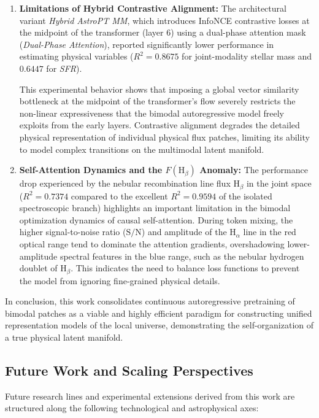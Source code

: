 \begin{enumerate}
	\item \textbf{Limitations of Hybrid Contrastive Alignment:} 
	The architectural variant \textit{Hybrid AstroPT MM}, which introduces InfoNCE contrastive losses at the midpoint of the transformer (layer 6) using a dual-phase attention mask (\textit{Dual-Phase Attention}), reported significantly lower performance in estimating physical variables ($R^2 = 0.8675$ for joint-modality stellar mass and $0.6447$ for \textit{\gls{SFR}}). 
	
	This experimental behavior shows that imposing a global vector similarity bottleneck at the midpoint of the transformer's flow severely restricts the non-linear expressiveness that the bimodal autoregressive model freely exploits from the early layers. Contrastive alignment degrades the detailed physical representation of individual physical flux patches, limiting its ability to model complex transitions on the multimodal latent manifold.
	
	\item \textbf{Self-Attention Dynamics and the $F(\text{H}_\beta)$ Anomaly:} 
	The performance drop experienced by the nebular recombination line flux $\text{H}_\beta$ in the joint space ($R^2 = 0.7374$ compared to the excellent $R^2 = 0.9594$ of the isolated spectroscopic branch) highlights an important limitation in the bimodal optimization dynamics of causal self-attention. During token mixing, the higher signal-to-noise ratio ($\text{S/N}$) and amplitude of the $\text{H}_\alpha$ line in the red optical range tend to dominate the attention gradients, overshadowing lower-amplitude spectral features in the blue range, such as the nebular hydrogen doublet of $\text{H}_\beta$. This indicates the need to balance loss functions to prevent the model from ignoring fine-grained physical details.
\end{enumerate}

In conclusion, this work consolidates continuous autoregressive pretraining of bimodal patches as a viable and highly efficient paradigm for constructing unified representation models of the local universe, demonstrating the self-organization of a true physical latent manifold.

\subsection{Future Work and Scaling Perspectives} \label{sec:concl:future}

Future research lines and experimental extensions derived from this work are structured along the following technological and astrophysical axes:

